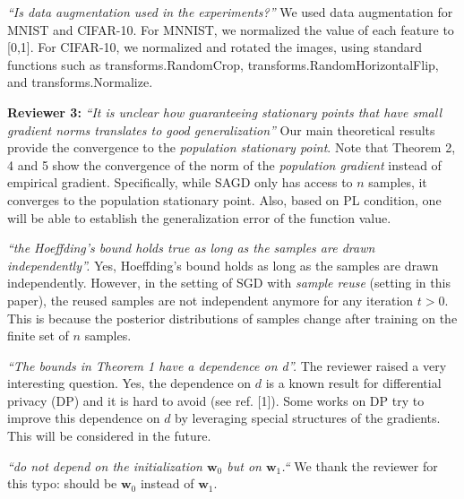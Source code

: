 \documentclass{article}
\begin{document}
\textit{``Is data augmentation used in the experiments?''}
We used data augmentation for MNIST and CIFAR-10. 
For MNNIST, we normalized the value of each feature to [0,1]. 
For CIFAR-10, we normalized and rotated the images, using standard functions such as transforms.RandomCrop, transforms.RandomHorizontalFlip, and transforms.Normalize. \vspace{-5pt}
    


\textbf{Reviewer 3:}
\textit{``It is unclear how guaranteeing stationary points that have small gradient norms translates to good generalization''}
Our main theoretical results provide the convergence to the \emph{population stationary point}. Note that Theorem 2, 4 and 5 show the convergence of the norm of the \emph{population gradient} instead of empirical gradient. 
Specifically, while SAGD only has access to $n$ samples, it converges to the population stationary point. 
Also, based on PL condition, one will be able to establish the generalization error of the function value. \vspace{-5pt}
    
\textit{``the Hoeffding's bound holds true as long as the samples are drawn independently''.}
 Yes, Hoeffding's bound holds as long as the samples are drawn independently. 
However, in the setting of SGD with \emph{sample reuse} (setting in this paper), the reused samples are not independent anymore for any iteration $t > 0$. 
This is because the posterior distributions of samples change after training on the finite set of $n$ samples. \vspace{-5pt}
 

 \textit{``The bounds in Theorem 1 have a dependence on d''.}
The reviewer raised a very interesting question.
Yes, the dependence on $d$ is a known result for differential privacy (DP) and it is hard to avoid (see ref. [1]). 
Some works on DP try to improve this dependence on $d$ by leveraging special structures of the gradients. 
This will be considered in the future. \vspace{-5pt}
    

\textit{``do not depend on the initialization $\mathbf{w}_0$ but on $\mathbf{w}_1$.``}
We thank the reviewer for this typo: should be $\mathbf{w}_0$ instead of $\mathbf{w}_1$.\vspace{-5pt}
    
\end{document}
